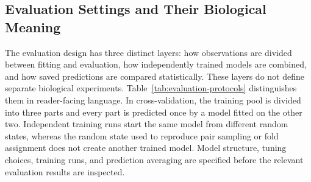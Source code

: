 \subsection{Evaluation Settings and Their Biological Meaning}

The evaluation design has three distinct layers: how observations are divided between fitting and evaluation, how independently trained models are combined, and how saved predictions are compared statistically. These layers do not define separate biological experiments. Table~\ref{tab:evaluation-protocols} distinguishes them in reader-facing language. In cross-validation, the training pool is divided into three parts and every part is predicted once by a model fitted on the other two. Independent training runs start the same model from different random states, whereas the random state used to reproduce pair sampling or fold assignment does not create another trained model. Model structure, tuning choices, training runs, and prediction averaging are specified before the relevant evaluation results are inspected.

